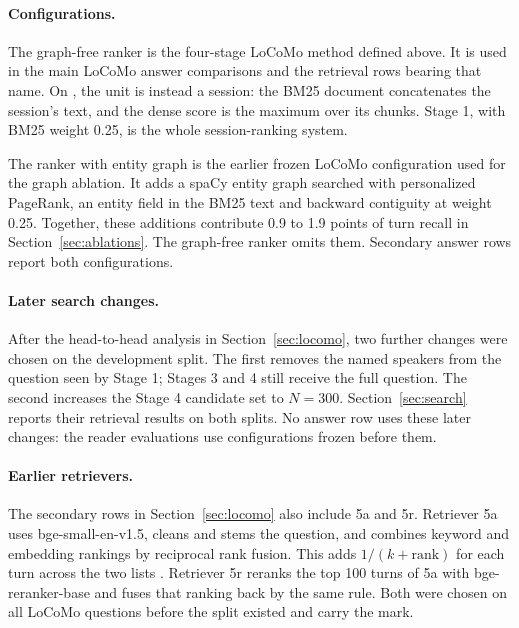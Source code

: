 \paragraph{Configurations.}
The graph-free ranker is the four-stage LoCoMo method defined above. It is used in the main LoCoMo answer comparisons and the retrieval rows bearing that name. On \lmes{}, the unit is instead a session: the BM25 document concatenates the session's text, and the dense score is the maximum over its chunks. Stage 1, with BM25 weight 0.25, is the whole session-ranking system.

The ranker with entity graph is the earlier frozen LoCoMo configuration used for the graph ablation. It adds a spaCy entity graph searched with personalized PageRank, an entity field in the BM25 text and backward contiguity at weight 0.25. Together, these additions contribute 0.9 to 1.9 points of turn recall in Section~\ref{sec:ablations}. The graph-free ranker omits them. Secondary answer rows report both configurations.

\paragraph{Later search changes.}
After the head-to-head analysis in Section~\ref{sec:locomo}, two further changes were chosen on the development split. The first removes the named speakers from the question seen by Stage 1; Stages 3 and 4 still receive the full question. The second increases the Stage 4 candidate set to $N = 300$. Section~\ref{sec:search} reports their retrieval results on both splits. No answer row uses these later changes: the reader evaluations use configurations frozen before them.

\paragraph{Earlier retrievers.}
The secondary rows in Section~\ref{sec:locomo} also include 5a and 5r. Retriever 5a uses bge-small-en-v1.5, cleans and stems the question, and combines keyword and embedding rankings by reciprocal rank fusion. This adds $1/(k + \mathrm{rank})$ for each turn across the two lists \citep{cormack2009rrf}. Retriever 5r reranks the top 100 turns of 5a with bge-reranker-base and fuses that ranking back by the same rule. Both were chosen on all LoCoMo questions before the split existed and carry the \tun{} mark.

